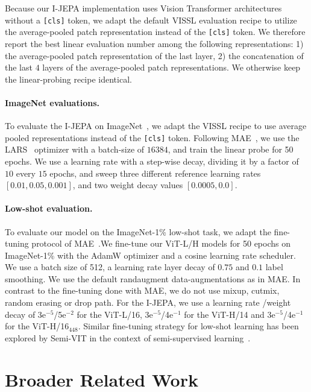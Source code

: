 \documentclass[10pt,twocolumn,letterpaper]{article}
\newcommand{\putalg}{{I-JEPA}\xspace}
\begin{document}
Because our \putalg implementation uses Vision Transformer architectures without a {\tt [cls]} token, we adapt the default VISSL evaluation recipe to utilize the average-pooled patch representation instead of the {\tt [cls]} token. 
We therefore report the best linear evaluation number among the following representations: 1) the average-pooled patch representation of the last layer, 2) the concatenation of the last $4$ layers of the average-pooled patch representations.
We otherwise keep the linear-probing recipe identical.

\paragraph{ImageNet evaluations.}
To evaluate the \putalg on ImageNet~\cite{russakovsky2015imagenet}, we adapt the VISSL recipe to use average pooled representations instead of the {\tt [cls]} token.
Following MAE~\cite{he2021masked}, we use the LARS~\cite{lars} optimizer with a batch-size of $16384$, and train the linear probe for 50 epochs.
We use a learning rate with a step-wise decay, dividing it by a factor of $10$ every $15$ epochs, and sweep three different reference learning rates $[0.01, 0.05, 0.001]$, and two weight decay values $[0.0005, 0.0]$. 

\paragraph{Low-shot evaluation.} To evaluate our model on the ImageNet-1\% low-shot task, we adapt the fine-tuning protocol of MAE~\cite{he2021masked}.We fine-tune our ViT-L/H models for 50 epochs on ImageNet-1\% with the AdamW optimizer and a cosine learning rate scheduler. We use a batch size of 512, a learning rate layer decay of $0.75$ and $0.1$ label smoothing. We use the default randaugment data-augmentations as in MAE. In contrast to the fine-tuning done with MAE, we do not use mixup, cutmix, random erasing  or drop path. For the \putalg, we use a learning rate /weight decay of 3e$^{-5}$/5e$^{-2}$ for the ViT-L/16, 3e$^{-5}$/4e$^{-1}$ for the ViT-H/14 and 3e$^{-5}$/4e$^{-1}$ for the ViT-H/16$_{448}$.  Similar fine-tuning strategy for low-shot learning has been explored by Semi-VIT in the context of semi-supervised learning~\cite{cai2022semi}.

\section{Broader Related Work}
\end{document}
